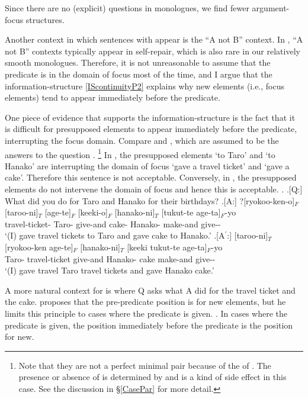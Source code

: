 Since there are no (explicit) questions in monologues,
we find fewer argument-focus structures.

Another context in which sentences with  appear is the ``A not B'' context.
In , ``A not B'' contexts typically appear in self-repair,
which is also rare in our relatively smooth monologues.
Therefore, it is not unreasonable to assume that the predicate is in the domain of focus most of the time,
and I argue that the information-structure  \ref{IScontinuityP2} explains why new elements (i.e., focus elements) tend to appear immediately before the predicate.

One piece of evidence that supports the information-structure  is the fact that
it is difficult for presupposed elements to appear immediately before the predicate,
interrupting the focus domain.
Compare \Next[A] and \Next[A$^{\prime}$],
which are assumed to be the answers to the question \Next[Q].%
	\footnote{
	Note that they are not a perfect minimal pair because of the  of .
	The presence or absence of  is determined by  and
	 is a kind of side effect in this case.
	See the discussion in \S \ref{CasePar} for more detail.
	}
In \Next[A],
the presupposed elements  `to Taro' and  `to Hanako' are interrupting the domain of focus `gave a travel ticket' and `gave a cake'.
Therefore this sentence is not acceptable.
Conversely, in \Next[A$^{\prime}$],
the presupposed elements do not intervene the domain of focus and hence this is acceptable.
%
\ex.
 \a.[Q:] What did you do for Taro and Hanako for their birthdays?
 \bg.[A:] ?[ryokoo-ken-o]$_{F}$ [taroo-ni]$_{T}$ [age-te]$_{F}$ [keeki-o]$_{F}$ [hanako-ni]$_{T}$ [tukut-te age-ta]$_{F}$-yo \\
 			travel-ticket- Taro- give-and cake- Hanako- make-and give-- \\
			`(I) gave travel tickets to Taro and gave cake to Hanako.'
 \bg.[A$^{\prime}$:] [taroo-ni]$_{T}$ [ryokoo-ken age-te]$_{F}$ [hanako-ni]$_{T}$ [keeki tukut-te age-ta]$_{F}$-yo \\
 			Taro- travel-ticket give-and Hanako- cake make-and give-- \\
			`(I) gave travel Taro travel tickets and gave Hanako cake.'

A more natural context for \Last[A] is where Q asks
what A did for the travel ticket and the cake.
 proposes that
the pre-predicate position is for new elements,
but he limits this principle to cases
where the predicate is given.
%
\ex.
 In cases where the predicate is given,
 the position immediately before the predicate is the position for new.
 \hfill{\cite[][60, translated by the current author]{kuno78}}


